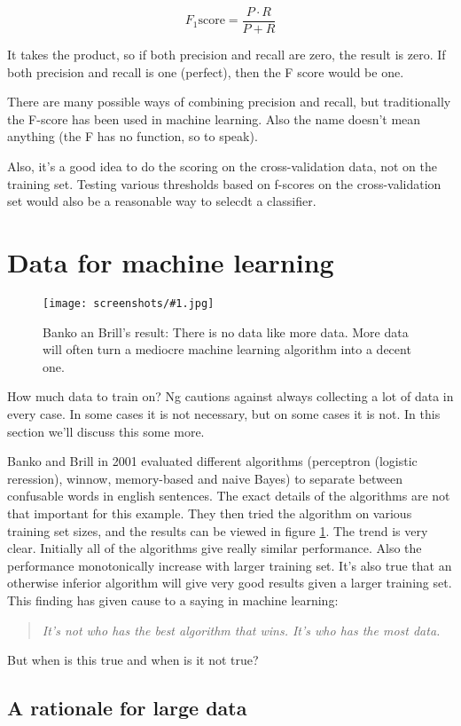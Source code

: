 \documentclass[a4, 12pt, english, USenglish]{scrreprt}
\newcommand{\screenshot}[2]{
\begin{figure}[htb]
\texttt{[image: screenshots/\#1.jpg]}
\label{#1}
\caption{#2}
\end{figure}}
\begin{document}
\[F_1 \mbox{score} = \frac{P\cdot R}{P + R}\]

It takes the product, so if both precision and recall are zero, the
result is zero.  If both precision and recall is one (perfect), then
the F score would be one.


There are many possible ways of combining precision
and recall, but traditionally the F-score has been used in machine
learning. Also the name doesn't mean anything (the F has no function,
so to speak).  

Also, it's a good idea to do the scoring on the cross-validation data,
not on the training set.  Testing various thresholds based on f-scores
on the cross-validation set would also be a reasonable way to selecdt
a classifier.

\section{Data for machine learning}

\screenshot{bankobrill}{Banko an Brill's result: There is no data like
  more data.  More data will often turn a mediocre machine learning
  algorithm into a decent one.}

How much data to train on?   Ng cautions against always collecting a
lot of data in every case.  In some cases it is not necessary, but on
some cases it is not. In this section we'll discuss this some more.

Banko and Brill in 2001  evaluated different algorithms (perceptron (logistic
reression), winnow, memory-based and naive Bayes)  to separate
between confusable words in english sentences.  The exact details of
the algorithms are not that important for this example.  They then
tried the algorithm on various training set sizes, and the results can
be viewed in figure \ref{bankobrill}.  The trend is very clear.
Initially all of the algorithms give really similar performance.
Also the performance monotonically increase with larger training set.
It's also true that an otherwise inferior algorithm will give very
good results given a larger training set.   This finding has given
cause to a saying in machine learning:

\begin{quote}
\em  It's not who has the best algorithm that wins. It's who has the
most data.
\end{quote}

But when is this true and when is it not true?   

\subsection{A rationale for large data}
\end{document}
